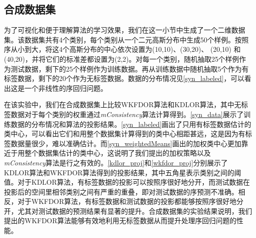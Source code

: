 \subsection{合成数据集}
为了可视化和便于理解算法的学习效果，我们在这一小节中生成了一个二维数据集。该数据集共有4个类别，每个类别从一个二元高斯分布中生成50个样例。按照序从小到大，将这4个高斯分布的中心依次设置为(10,10)、(30,20)、 (20,10) 和(40,20)，并将它们的标准差都设置为(2,2)。对每一个类别，随机抽取25个样例作为测试数据，剩下的25个样例作为训练数据。再从训练数据中随机抽取5个作为有标签数据，剩下的20个作为无标签数据。数据的分布情况见\autoref{syn_labeled}，可以看出这是一个非线性的序回归问题。

在该实验中，我们在合成数据集上比较WKFDOR算法和KDLOR算法，其中无标签数据对于每个类别的权重通过\textit{mConsistency}算法计算得到。\autoref{syn_data}展示了训练数据的分布情况和算法的投影结果。\autoref{syn_labeled}画出了只用有标签数据估计的类中心，可以看出它们和用整个数据集计算得到的类中心相距甚远，这是因为有标签数据量很少，难以准确估计。而\autoref{syn_weightedMeans}画出的加权类中心更加靠近于用整个数据集估计的类中心，这说明了我们提出的加权策略以及 \textit{mConsistency}算法是行之有效的。\autoref{kdlor_proj}和\autoref{wkfdor_proj}分别展示了KDLOR算法和WKFDOR算法得到的投影结果，其中五角星表示类别之间的阈值。对于KDLOR算法，有标签数据的投影可以按照序很好地分开，而测试数据在投影后的空间里相邻类别之间有严重的重叠，即对测试数据的序预测不准确。相反，对于WKFDOR算法，有标签数据和测试数据的投影都能够按照序很好地分开，尤其对测试数据的预测结果有显著的提升。合成数据集的实验结果说明，我们提出的WKFDOR算法能够有效地利用无标签数据从而提升处理序回归问题的性能。

